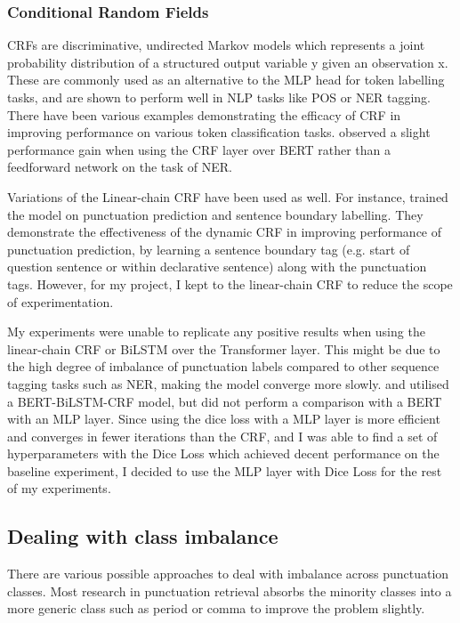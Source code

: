 \documentclass[a4paper]{article}
\begin{document}
\begin{multicols}{2}
\subsubsection{Conditional Random Fields}
CRFs \citep{crf} are discriminative, undirected Markov models which represents a joint probability distribution of a structured output variable y given an observation x. These are commonly used as an alternative to the MLP head for token labelling tasks, and are shown to perform well in NLP tasks like POS or NER tagging. There have been various examples demonstrating the efficacy of CRF in improving performance on various token classification tasks. \citet{rosvall2019comparison} observed a slight performance gain when using the CRF layer over BERT rather than a feedforward network on the task of NER.

Variations of the Linear-chain CRF have been used as well. For instance, \cite{dynamiccrf} trained the model on punctuation prediction and sentence boundary labelling. They demonstrate the effectiveness of the dynamic CRF in improving performance of punctuation prediction, by learning a sentence boundary tag (e.g. start of question sentence or within declarative sentence) along with the punctuation tags. However, for my project, I kept to the linear-chain CRF to reduce the scope of experimentation.

My experiments were unable to replicate any positive results when using the linear-chain CRF or BiLSTM over the Transformer layer. This might be due to the high degree of imbalance of punctuation labels compared to other sequence tagging tasks such as NER, making the model converge more slowly. \cite{pandababa} and \cite{adversarial} utilised a BERT-BiLSTM-CRF model, but did not perform a comparison with a BERT with an MLP layer. Since using the dice loss with a MLP layer is more efficient and converges in fewer iterations than the CRF, and I was able to find a set of hyperparameters with the Dice Loss which achieved decent performance on the baseline experiment, I decided to use the MLP layer with Dice Loss for the rest of my experiments.

\subsection{Dealing with class imbalance}
There are various possible approaches to deal with imbalance across punctuation classes. Most research in punctuation retrieval absorbs the minority classes into a more generic class such as period or comma to improve the problem slightly.


\end{multicols}
\end{document}
